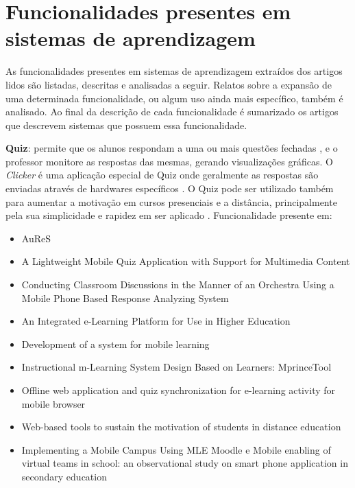 \section{Funcionalidades presentes em sistemas de aprendizagem}

As funcionalidades presentes em sistemas de aprendizagem extraídos dos artigos lidos são listadas, descritas e analisadas a seguir. Relatos sobre a expansão de uma determinada funcionalidade, ou algum uso ainda mais específico, também é analisado. Ao final da descrição de cada funcionalidade é sumarizado os artigos que descrevem sistemas que possuem essa funcionalidade.

\textbf{Quiz}: permite que os alunos respondam a uma ou mais questões fechadas \cite{tokiwa_web-based_2009, ijtihadie_offline_2010, schmiedl_mobile_2010, covic_development_2010, schon_lightweight_2012}, e o professor monitore as respostas das mesmas, gerando visualizações gráficas. O \emph{Clicker} é uma aplicação especial de Quiz onde geralmente as respostas são enviadas através de hardwares específicos \cite{tokiwa_web-based_2009}. O Quiz pode ser utilizado também para aumentar a motivação em cursos presenciais e a distância, principalmente pela sua simplicidade e rapidez em ser aplicado \cite{tokiwa_web-based_2009}. Funcionalidade presente em:

\vspace{-5mm}
\begin{itemize}
\item AuReS \cite{jagar_auress:_2012}
\item A Lightweight Mobile Quiz Application with Support for Multimedia Content \cite{schon_lightweight_2012}
\item Conducting Classroom Discussions in the Manner of an Orchestra Using a Mobile Phone Based Response Analyzing System \cite{nakai_conducting_2007}
\item An Integrated e-Learning Platform for Use in Higher Education \cite{florea_integrated_2011}
\item Development of a system for mobile learning \cite{covic_development_2010}
\item Instructional m-Learning System Design Based on Learners: MprinceTool \cite{fardoun_instructional_2010}
\item Offline web application and quiz synchronization for e-learning activity for mobile browser \cite{ijtihadie_offline_2010}
\item Web-based tools to sustain the motivation of students in distance education \cite{tokiwa_web-based_2009}
\item Implementing a Mobile Campus Using MLE Moodle \cite{xhafa_implementing_2010} e Mobile enabling of virtual teams in school: an observational study on smart phone application in secondary education \cite{schmiedl_mobile_2010}
\end{itemize}

